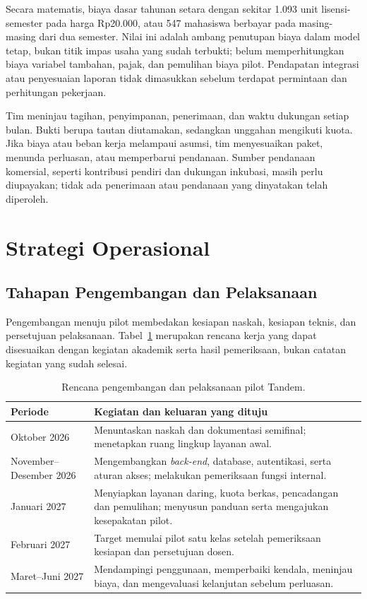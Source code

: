 \documentclass[12pt,a4paper,oneside]{report}
\begin{document}
Secara matematis, biaya dasar tahunan setara dengan sekitar 1.093 unit lisensi-semester pada harga Rp20.000, atau 547 mahasiswa berbayar pada masing-masing dari dua semester. Nilai ini adalah ambang penutupan biaya dalam model tetap, bukan titik impas usaha yang sudah terbukti; belum memperhitungkan biaya variabel tambahan, pajak, dan pemulihan biaya pilot. Pendapatan integrasi atau penyesuaian laporan tidak dimasukkan sebelum terdapat permintaan dan perhitungan pekerjaan.

Tim meninjau tagihan, penyimpanan, penerimaan, dan waktu dukungan setiap bulan. Bukti berupa tautan diutamakan, sedangkan unggahan mengikuti kuota. Jika biaya atau beban kerja melampaui asumsi, tim menyesuaikan paket, menunda perluasan, atau memperbarui pendanaan. Sumber pendanaan komersial, seperti kontribusi pendiri dan dukungan inkubasi, masih perlu diupayakan; tidak ada penerimaan atau pendanaan yang dinyatakan telah diperoleh.

\section{Strategi Operasional}
\subsection{Tahapan Pengembangan dan Pelaksanaan}
Pengembangan menuju pilot membedakan kesiapan naskah, kesiapan teknis, dan persetujuan pelaksanaan. Tabel~\ref{tab:jadwal} merupakan rencana kerja yang dapat disesuaikan dengan kegiatan akademik serta hasil pemeriksaan, bukan catatan kegiatan yang sudah selesai.
\begin{table}[!htbp]
\centering
\singlespacing
\caption{Rencana pengembangan dan pelaksanaan pilot Tandem.}
\label{tab:jadwal}
\begin{tabularx}{\textwidth}{@{}>{\raggedright\arraybackslash}p{3.1cm}>{\raggedright\arraybackslash}X@{}}
\toprule
\textbf{Periode} & \textbf{Kegiatan dan keluaran yang dituju} \tabularnewline
\midrule
Oktober 2026 & Menuntaskan naskah dan dokumentasi semifinal; menetapkan ruang lingkup layanan awal. \tabularnewline
November--Desember 2026 & Mengembangkan \textit{back-end}, database, autentikasi, serta aturan akses; melakukan pemeriksaan fungsi internal. \tabularnewline
Januari 2027 & Menyiapkan layanan daring, kuota berkas, pencadangan dan pemulihan; menyusun panduan serta mengajukan kesepakatan pilot. \tabularnewline
Februari 2027 & Target memulai pilot satu kelas setelah pemeriksaan kesiapan dan persetujuan dosen. \tabularnewline
Maret--Juni 2027 & Mendampingi penggunaan, memperbaiki kendala, meninjau biaya, dan mengevaluasi kelanjutan sebelum perluasan. \tabularnewline
\bottomrule
\end{tabularx}
\end{table}
\FloatBarrier
\end{document}
